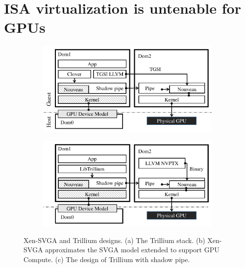\chapter{ISA virtualization is untenable for GPUs}
\label{sec:trillium}

\begin{figure}[!th]
	\centering
	\begin{subfigure}{0.45\linewidth}
		\includegraphics[width=\linewidth,trim={0 0 0 0},clip]{figures/xen-svga.pdf}
		\caption{{}}
		\label{fig_xen_svga}
	\end{subfigure}\hfill
	\begin{subfigure}{0.45\linewidth}
		\includegraphics[width=\linewidth,trim={0.6cm 0 0 0},clip]{figures/trillium.pdf}
		\caption{{}}
		\label{fig_trillium}
	\end{subfigure}
	\caption{Xen-SVGA and Trillium designs. (a) The Trillium stack. (b) Xen-SVGA approximates the SVGA model extended to support GPU Compute. (c) The design of Trillium with shadow pipe.}
\end{figure}

